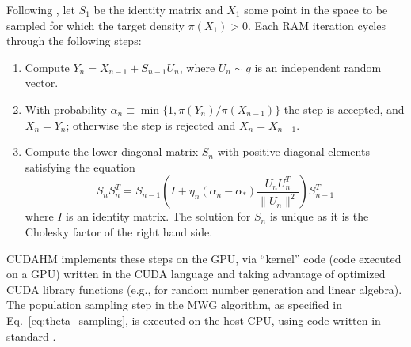 Following \cite{vihola2012robust}, let $S_{1}$ be the identity matrix and $X_{1}$ some point in the space to be sampled for which the target density $\pi(X_{1})>0$.
Each RAM iteration cycles through the following steps: 
\begin{enumerate} \item Compute $Y_{n}=X_{n-1}+S_{n-1}U_{n}$, where $U_{n}\sim q$ is an independent random vector.
\item With probability $\alpha_{n} \equiv \min\{1,\pi(Y_{n})/\pi(X_{n-1})\}$ the step is accepted, and $X_{n}=Y_{n}$; otherwise the step is rejected and $X_{n}=X_{n-1}$.
\item Compute the lower-diagonal matrix $S_{n}$ with positive diagonal elements satisfying the equation
\begin{equation}
S_{n}S_{n}^{T}=S_{n-1}\left(I+\eta_{n}(\alpha_{n}-\alpha_{*})\frac{U_{n}U_{n}^{T}}{\parallel U_{n}\parallel^{2}}\right)S_{n-1}^{T}
\end{equation}
where $I$ is an identity matrix.
The solution for $S_{n}$ is unique as it is the Cholesky factor of the right hand side.
\end{enumerate}
CUDAHM implements these steps on the GPU, via ``kernel'' code (code executed on a GPU) written in the CUDA language and taking advantage of optimized CUDA library functions (e.g., for random number generation and linear algebra).
The population sampling step in the MWG algorithm, as specified in Eq.~\ref{eq:theta_sampling}, is executed on the host CPU, using code written in standard \Cpp.



